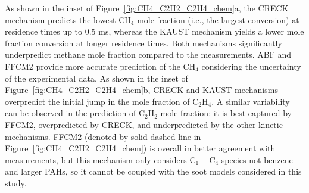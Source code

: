 As shown in the inset of Figure~\ref{fig:CH4_C2H2_C2H4_chem}a, the CRECK mechanism predicts the lowest $\mathrm{CH_4}$ mole fraction (i.e., the largest conversion) at residence times up to 0.5 ms, whereas the KAUST mechanism yields a lower mole fraction conversion at longer residence times. Both mechanisms significantly underpredict methane mole fraction compared to the measurements. ABF and FFCM2 provide more accurate prediction of the $\mathrm{CH_4}$ considering the uncertainty of the experimental data. As shown in the inset of Figure~\ref{fig:CH4_C2H2_C2H4_chem}b, CRECK and KAUST mechanisms overpredict the initial jump in the mole fraction of  $\mathrm{C_2H_4}$. A similar variability can be observed in the prediction of $\mathrm{C_2H_2}$ mole fraction: it is best captured by FFCM2, overpredicted by CRECK, and underpredicted by the other kinetic mechanisms. FFCM2 (denoted by solid dashed line in Figure~\ref{fig:CH4_C2H2_C2H4_chem}) is overall in better agreement with measurements, but this mechanism only considers $\mathrm{C_1}-\mathrm{C_4}$ species not benzene and larger PAHs, so it cannot be coupled with the soot models considered in this study.
 
